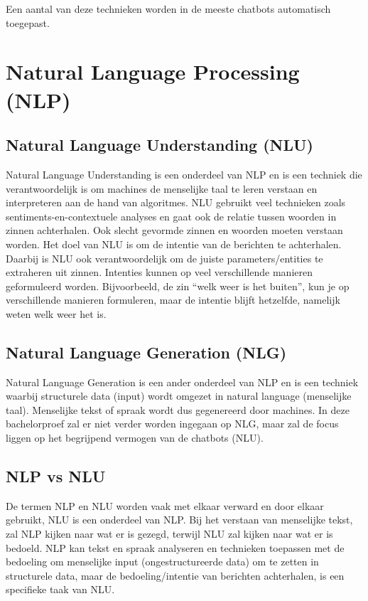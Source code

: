 Een aantal van deze technieken worden in de meeste chatbots automatisch toegepast.


\section{Natural Language Processing (NLP)}
\label{sec:nlp}

\subsection{Natural Language Understanding (NLU)}
\label{subsec:nlp-nlu}

Natural Language Understanding is een onderdeel van NLP en is een techniek die verantwoordelijk is om machines de menselijke taal te leren verstaan en interpreteren aan de hand van algoritmes. NLU gebruikt veel technieken zoals sentiments-en-contextuele analyses en gaat ook de relatie tussen woorden in zinnen achterhalen. Ook slecht gevormde zinnen en woorden moeten verstaan worden. Het doel van NLU is om de intentie van de berichten te achterhalen. Daarbij is NLU ook verantwoordelijk om de juiste parameters/entities te extraheren uit zinnen. Intenties kunnen op veel verschillende manieren geformuleerd worden. Bijvoorbeeld, de zin “welk weer is het buiten”,  kun je op verschillende manieren formuleren, maar de intentie blijft hetzelfde, namelijk weten welk weer het is.


\subsection{Natural Language Generation (NLG)}
\label{subsec:nlp-nlg}


Natural Language Generation is een ander onderdeel van NLP en is een techniek waarbij structurele data (input) wordt omgezet in natural language (menselijke taal). Menselijke tekst of spraak wordt dus gegenereerd door machines. In deze bachelorproef zal er niet verder worden ingegaan op NLG, maar zal de focus liggen op het begrijpend vermogen van de chatbots (NLU).


\subsection{NLP vs NLU}
\label{subsec:nlp-nlp-vs-nlu}


De termen NLP en NLU worden vaak met elkaar verward en door elkaar gebruikt, NLU is een onderdeel van NLP. Bij het verstaan van menselijke tekst, zal NLP kijken naar wat er is gezegd, terwijl NLU zal kijken naar wat er is bedoeld. NLP kan tekst en spraak analyseren en technieken toepassen met de bedoeling om menselijke input (ongestructureerde data) om te zetten in structurele data, maar de bedoeling/intentie van berichten achterhalen, is een specifieke taak van NLU. 

